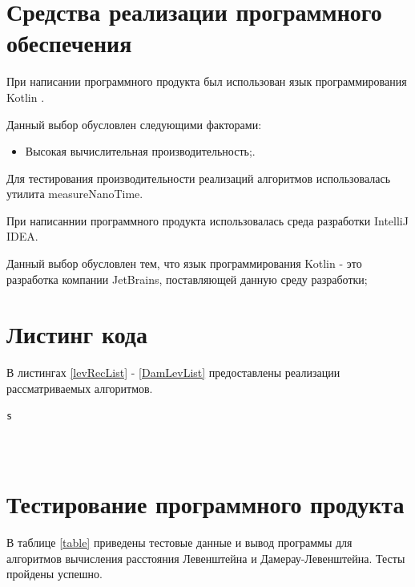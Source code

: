 \documentclass[12pt]{report}
\begin{document}
\section{Средства реализации программного обеспечения}
При написании программного продукта был использован язык программирования Kotlin \cite{Kotlin}.

Данный выбор обусловлен следующими факторами:
\begin{itemize}
\item Высокая вычислительная производительность;.
\end{itemize}

Для тестирования производительности реализаций алгоритмов использовалась утилита measureNanoTime.

При написаннии программного продукта использовалась среда разработки IntelliJ IDEA.

Данный выбор обусловлен тем, что язык программирования Kotlin - это разработка компании JetBrains, поставляющей данную среду разработки;

\section{Листинг кода}
В листингах \ref{levRecList} - \ref{DamLevList} предоставлены реализации рассматриваемых алгоритмов.
\begin{lstlisting}[caption=Функция реализации рекурсивного алгоритма Левенштейна,
label={levRecList}]
s
\end{lstlisting}

\begin{lstlisting}[caption=Функция реализации рекурсивного алгоритма Левенштейна с использованием матрицы расстояний,
label={levRecMatList}]

\end{lstlisting}

\begin{lstlisting}[caption=Функция реализации итеративного алгоритма Левенштейна,
label={levIterList}]

\end{lstlisting}

\begin{lstlisting}[caption=Функция реализации алгоритма Дамерау-Левенштейна,
label={DamLevList}]

\end{lstlisting}

\section{Тестирование программного продукта}
В таблице \ref{table} приведены тестовые данные и вывод программы для алгоритмов вычисления расстояния Левенштейна и Дамерау-Левенштейна. Тесты пройдены успешно.
\end{document}
